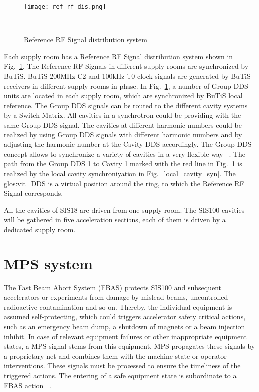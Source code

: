 \begin{figure}[!htb]
   \centering   
   \texttt{[image: ref\_rf\_dis.png]}
   \caption{Reference RF Signal distribution system}{~\cite{klingbeil_new_2011}}
   \label{ref_rf_dis}
\end{figure}
Each supply room has a Reference RF Signal distribution system shown in Fig.~\ref{ref_rf_dis}. The Reference RF Signals in different supply rooms are synchronized by BuTiS. BuTiS 200MHz C2 and 100kHz T0 clock signals are generated by BuTiS receivers in different supply rooms in phase. In Fig.~\ref{ref_rf_dis}, a number of Group DDS units are located in each supply room, which are synchronized by BuTiS local reference. The Group DDS signals can be routed to the different cavity systems by a Switch Matrix. All cavities in a synchrotron could be providing with the same Group DDS signal. The cavities at different harmonic numbers could be realized by using Group DDS signals with different harmonic numbers and by adjusting the harmonic number at the Cavity DDS accordingly. The Group DDS concept allows to synchronize a variety of cavities in a very flexible way ~\cite{klingbeil_new_2011}.  The path from the Group DDS 1 to Cavity 1 marked with the red line in Fig.~\ref{ref_rf_dis} is realized by the local cavity synchroniyation in Fig.~\ref{local_cavity_syn}.  The \gls{glos:vit_DDS} is a virtual position around the ring, to which the Reference RF Signal corresponds.

All the cavities of SIS18 are driven from one supply room. The SIS100 cavities will be gathered in five acceleration sections, each of them is driven by a dedicated supply room. 

\section{\gls{MPS} system}
The Fast Beam Abort System (\gls{FBAS}) protects SIS100 and subsequent accelerators or experiments from damage by mislead beams, uncontrolled radioactive contamination and so on. Thereby, the individual equipment is assumed self-protecting, which could triggers accelerator safety critical actions, such as an emergency beam dump, a shutdown of magnets or a beam injection inhibit. In case of relevant equipment failures or other inappropriate equipment states, a MPS signal stems from this equipment. MPS propagates these signals by a proprietary net and combines them with the machine state or operator interventions. These signals must be processed to ensure the timeliness of the triggered actions. The entering of a safe equipment state is subordinate to a FBAS action ~\cite{mandakovic_fair_????}.



